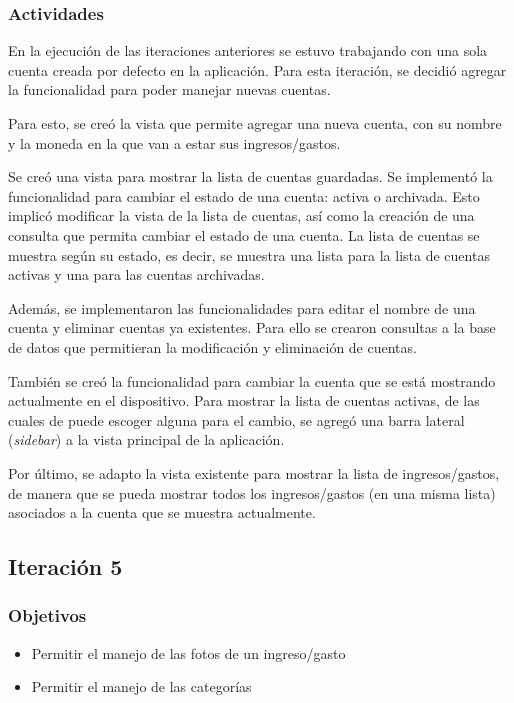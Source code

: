 \subsubsection{Actividades}
En la ejecución de las iteraciones anteriores se estuvo trabajando con una sola cuenta creada por defecto en la aplicación. Para esta iteración, se decidió agregar la funcionalidad para poder manejar nuevas cuentas. 

Para esto, se creó la vista que permite agregar una nueva cuenta, con su nombre y la moneda en la que van a estar sus ingresos/gastos.

Se creó una vista para mostrar la lista de cuentas guardadas. Se implementó la funcionalidad para cambiar el estado de una cuenta: activa o archivada. Esto implicó modificar la vista de la lista de cuentas, así como la creación de una consulta que permita cambiar el estado de una cuenta. La lista de cuentas se muestra según su estado, es decir, se muestra una lista para la lista de cuentas activas y una para las cuentas archivadas. 

Además, se implementaron las funcionalidades para editar el nombre de una cuenta y eliminar cuentas ya existentes. Para ello se crearon consultas a la base de datos que permitieran la modificación y eliminación de cuentas.

También se creó la funcionalidad para cambiar la cuenta que se está mostrando actualmente en el dispositivo. Para mostrar la lista de cuentas activas, de las cuales de puede escoger alguna para el cambio, se agregó una barra lateral (\textit{sidebar}) a la vista principal de la aplicación.

Por último, se adapto la vista existente para mostrar la lista de ingresos/gastos, de manera que se pueda mostrar todos los ingresos/gastos (en una misma lista) asociados a la cuenta que se muestra actualmente.

\subsection{Iteración 5}
\subsubsection{Objetivos}
\begin{itemize}
\item Permitir el manejo de las fotos de un ingreso/gasto
\item Permitir el manejo de las categorías
\end{itemize}

